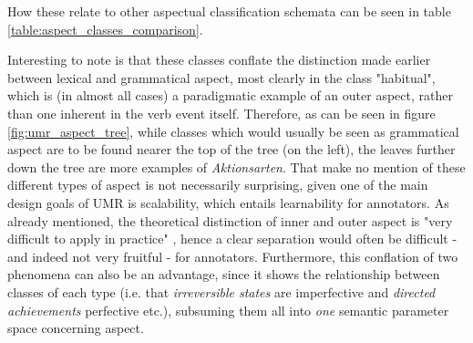 How these relate to other aspectual classification schemata can be seen in table \ref{table:aspect_classes_comparison}.

Interesting to note is that these classes conflate the distinction made earlier between lexical and grammatical aspect, most clearly in the class "habitual", which is (in almost all cases) a paradigmatic example of an outer aspect, rather than one inherent in the verb event itself. Therefore, as can be seen in figure \ref{fig:umr_aspect_tree}, while classes which would usually be seen as grammatical aspect are to be found nearer the top of the tree (on the left), the leaves further down the tree are more examples of \emph{Aktionsarten}. That \citet{umr} make no mention of these different types of aspect is not necessarily surprising, given one of the main design goals of UMR is scalability, which entails learnability for annotators. As already mentioned, the theoretical distinction of inner and outer aspect is "very difficult to apply in practice" \citep{Dahl1985TenseAA}, hence a clear separation would often be difficult - and indeed not very fruitful - for annotators. Furthermore, this conflation of two phenomena can also be an advantage, since it shows the relationship between classes of each type (i.e. that \emph{irreversible states} are imperfective and \emph{directed achievements} perfective etc.), subsuming them all into \emph{one} semantic parameter space concerning aspect.

